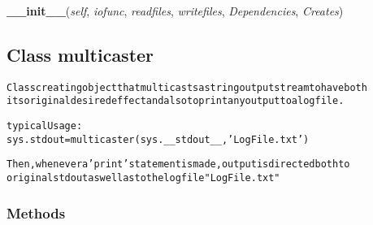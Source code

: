     \vspace{0.5ex}

\hspace{.8\funcindent}\begin{boxedminipage}{\funcwidth}

    \raggedright \textbf{\_\_init\_\_}(\textit{self}, \textit{iofunc}, \textit{readfiles}, \textit{writefiles}, \textit{Dependencies}, \textit{Creates})

\setlength{\parskip}{2ex}
\setlength{\parskip}{1ex}
    \end{boxedminipage}



\subsection{Class multicaster}

    \label{System:Utils:multicaster}
\begin{alltt}

Class creating object that multicasts a string output stream to have both
its original desired effect and also to print any output to a log file. 

typical Usage:
        sys.stdout = multicaster(sys.\_\_stdout\_\_,'LogFile.txt')

Then, whenever a 'print ' statement is made, output is directed both to
original stdout as well as to the logfile "LogFile.txt"
\end{alltt}



  \subsubsection{Methods}

    \label{System:Utils:multicaster:__init__}

